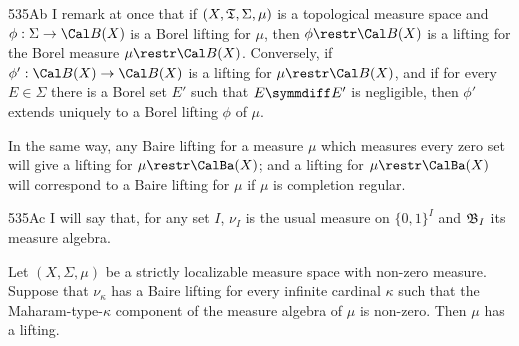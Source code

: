 \spheader 535Ab I remark at once that if $(X,\frak T,\Sigma,\mu)$ is a
topological measure space and $\phi:\Sigma\to\Cal B(X)$ is a Borel
lifting for $\mu$, then $\phi\restr\Cal B(X)$ is a lifting for the Borel
measure $\mu\restr\Cal B(X)$.   Conversely, if
$\phi':\Cal B(X)\to\Cal B(X)$ is a lifting for $\mu\restr\Cal B(X)$, and
if for every $E\in\Sigma$ there is a Borel set $E'$ such that
$E\symmdiff E'$ is negligible, then $\phi'$ extends uniquely to a Borel
lifting $\phi$ of $\mu$.

In the same way, any Baire lifting for a measure $\mu$ which measures
every zero set will give a lifting for $\mu\restr\CalBa(X)$;  and a lifting for $\mu\restr\CalBa(X)$ will correspond to a Baire lifting for $\mu$ if $\mu$ is completion regular.

\spheader 535Ac  I will say that, for any set
$I$, $\nu_I$ is the usual measure on $\{0,1\}^I$ and $\frak B_I$ its
measure algebra.

 Let $(X,\Sigma,\mu)$ be a strictly
localizable measure space with non-zero measure.   Suppose that
$\nu_{\kappa}$ has a Baire lifting for every
infinite cardinal $\kappa$
such that the Maharam-type-$\kappa$ component of the measure algebra of
$\mu$ is non-zero.   Then $\mu$ has a lifting.

